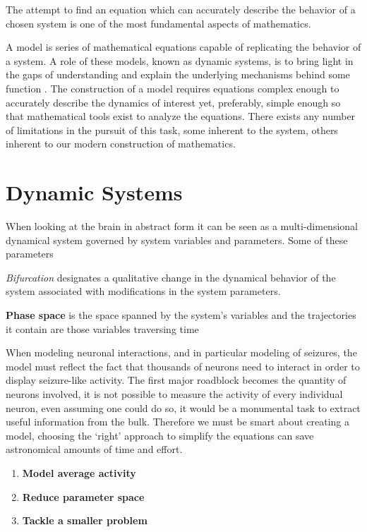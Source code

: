 \documentclass[../../Orator.tex]{subfiles}
\begin{document}
The attempt to find an equation which can accurately describe the behavior of a chosen system is one of the most fundamental aspects of mathematics.

A model is series of mathematical equations capable of replicating the behavior of a system. A role of these models, known as dynamic systems, is to bring light in the gaps of understanding and explain the underlying mechanisms behind some function \citelater. 
The construction of a model requires equations complex enough to accurately describe the dynamics of interest yet, preferably, simple enough so that mathematical tools exist to analyze the equations\footnotemark. 
There exists any number of limitations in the pursuit of this task, some inherent to the system, others inherent to our modern construction of mathematics.

\section{Dynamic Systems}

When looking at the brain in abstract form it can be seen as a multi-dimensional dynamical system  governed by system variables and parameters. Some of these parameters


\textit{Bifurcation} designates a qualitative change in the dynamical behavior of the system associated with modifications in the system parameters.


\textbf{Phase space} is the space spanned by the system's variables and the trajectories it contain are those variables traversing time




When modeling neuronal interactions, and in particular modeling of seizures, the model must reflect the fact that thousands of neurons need to interact in order to display seizure-like activity. 
The first major roadblock becomes the quantity of neurons involved, it is not possible to measure the activity of every individual neuron, even assuming one could do so, it would be a monumental task to extract useful information from the bulk. 
Therefore we must be smart about creating a model, choosing the `right' approach to simplify the equations can save astronomical amounts of time and effort.
\begin{enumerate}
    \item \textbf{Model average activity}
    \item \textbf{Reduce parameter space}
    \item \textbf{Tackle a smaller problem}
\end{enumerate}
\end{document}
